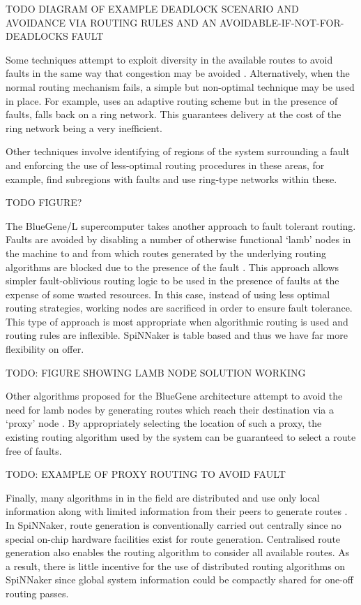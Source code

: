 		TODO DIAGRAM OF EXAMPLE DEADLOCK SCENARIO AND AVOIDANCE VIA ROUTING RULES
		AND AN AVOIDABLE-IF-NOT-FOR-DEADLOCKS FAULT
		
		Some techniques attempt to exploit diversity in the available routes to
		avoid faults in the same way that congestion may be avoided
		\cite{rodrigo08}. Alternatively, when the normal routing mechanism fails, a
		simple but non-optimal technique may be used in place. For example,
		\cite{puente07} uses an adaptive routing scheme but in the presence of
		faults, falls back on a ring network. This guarantees delivery at the cost
		of the ring network being a very inefficient.
		
		Other techniques involve identifying of regions of the system surrounding a
		fault and enforcing the use of less-optimal routing procedures in these
		areas, for example, \cite{boppana95,mejia06} find subregions with faults
		and use ring-type networks within these.
		
		TODO FIGURE?
		
		The BlueGene/L supercomputer \cite{adiga02} takes another approach to fault
		tolerant routing. Faults are avoided by disabling a number of otherwise
		functional `lamb' nodes in the machine to and from which routes generated
		by the underlying routing algorithms are blocked due to the presence of the
		fault \cite{ho04}. This approach allows simpler fault-oblivious routing
		logic to be used in the presence of faults at the expense of some wasted
		resources. In this case, instead of using less optimal routing strategies,
		working nodes are sacrificed in order to ensure fault tolerance. This type
		of approach is most appropriate when algorithmic routing is used and
		routing rules are inflexible. SpiNNaker is table based and thus we have far
		more flexibility on offer.
		
		TODO: FIGURE SHOWING LAMB NODE SOLUTION WORKING
		
		Other algorithms proposed for the BlueGene architecture attempt to avoid
		the need for lamb nodes by generating routes which reach their destination
		via a `proxy' node \cite{gomez04}. By appropriately selecting the location
		of such a proxy, the existing routing algorithm used by the system can be
		guaranteed to select a route free of faults.
		
		TODO: EXAMPLE OF PROXY ROUTING TO AVOID FAULT
		
		Finally, many algorithms in in the field are distributed and use only local
		information along with limited information from their peers to generate
		routes \cite{fick09b}. In SpiNNaker, route generation is conventionally
		carried out centrally since no special on-chip hardware facilities exist
		for route generation. Centralised route generation also enables the routing
		algorithm to consider all available routes. As a result, there is little
		incentive for the use of distributed routing algorithms on SpiNNaker since
		global system information could be compactly shared for one-off routing
		passes.
		
